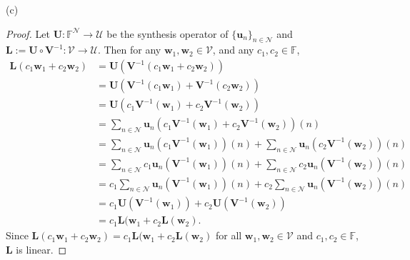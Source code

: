 \documentclass[12pt]{amsart}
\newcommand{\1}{\mathbbm{1}}
\numberwithin{equation}{section}
\numberwithin{Theorem}{section}
\theoremstyle{plain} %
\theoremstyle{definition}
\theoremstyle{remark}
\begin{document}
\begin{enumerate}[1.]
(c) 
\begin{proof}
Let
\(\mathbf{U}:\mathbb{F}^{\mathcal{N}}\to\mathcal{U}\) be the synthesis operator of \(\{\mathbf{u}_{n}\}_{n\in\mathcal{N}}\) and
\(\mathbf{L}:=\mathbf{U}\circ\mathbf{V}^{-1}:\mathcal{V}\to\mathcal{U}\).
Then for any
$\mathbf{w}_1,\mathbf{w}_2\in\mathcal{V}$, and any
$c_1,c_2\in\mathbb{F}$,
\begin{align*}
	\mathbf{L}(c_1\mathbf{w}_1 + c_2\mathbf{w}_2)
	&= \mathbf{U}(\mathbf{V}^{-1}(c_1\mathbf{w}_1 + c_2\mathbf{w}_2)) \\
	&= \mathbf{U}(\mathbf{V}^{-1}(c_1\mathbf{w}_1) + \mathbf{V}^{-1}(c_2\mathbf{w}_2)) \\
	&= \mathbf{U}(c_1\mathbf{V}^{-1}(\mathbf{w}_1) + c_2\mathbf{V}^{-1}(\mathbf{w}_2)) \\
	&= \sum_{n\in\mathcal{N}}\mathbf{u}_n(c_1\mathbf{V}^{-1}(\mathbf{w}_1) + c_2\mathbf{V}^{-1}(\mathbf{w}_2))(n) \\
	&= \sum_{n\in\mathcal{N}}\mathbf{u}_n(c_1\mathbf{V}^{-1}(\mathbf{w}_1))(n) + \sum_{n\in\mathcal{N}}\mathbf{u}_n(c_2\mathbf{V}^{-1}(\mathbf{w}_2))(n) \\
	&= \sum_{n\in\mathcal{N}}c_1\mathbf{u}_n(\mathbf{V}^{-1}(\mathbf{w}_1))(n) + \sum_{n\in\mathcal{N}}c_2\mathbf{u}_n(\mathbf{V}^{-1}(\mathbf{w}_2))(n) \\
	&= c_1\sum_{n\in\mathcal{N}}\mathbf{u}_n(\mathbf{V}^{-1}(\mathbf{w}_1))(n) + c_2\sum_{n\in\mathcal{N}}\mathbf{u}_n(\mathbf{V}^{-1}(\mathbf{w}_2))(n) \\
	&= c_1\mathbf{U}(\mathbf{V}^{-1}(\mathbf{w}_1)) + c_2\mathbf{U}(\mathbf{V}^{-1}(\mathbf{w}_2)) \\
	&= c_1\mathbf{L}(\mathbf{w}_1 + c_2\mathbf{L}(\mathbf{w}_2).
\end{align*}
Since 
$\mathbf{L}(c_1\mathbf{w}_1 + c_2\mathbf{w}_2) = 
c_1\mathbf{L}(\mathbf{w}_1 + c_2\mathbf{L}(\mathbf{w}_2)$
for all
$\mathbf{w}_1,\mathbf{w}_2\in\mathcal{V}$ and
$c_1,c_2\in\mathbb{F}$,
$\mathbf{L}$ is linear.
\end{proof}


\end{enumerate}
\end{document}
